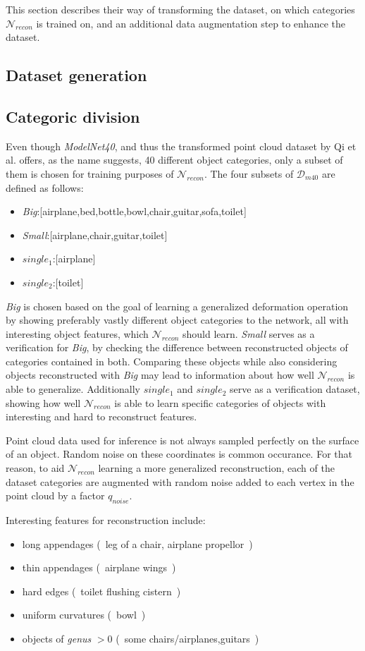    This section describes their way of transforming the dataset, on which categories
   $\mathcal{N}_{recon}$ is trained on, and an additional data augmentation step to
   enhance the dataset.

\subsection{Dataset generation}
\subsection{Categoric division}
Even though \emph{ModelNet40}, and thus the transformed point cloud dataset by Qi et al. offers, as the name suggests,
40 different object categories, only a subset of them is chosen for training purposes of $\mathcal{N}_{recon}$. 
The four subsets of $\mathcal{D}_{m40}$ are defined as follows:
\begin{itemize}
   \item \emph{Big}:[airplane,bed,bottle,bowl,chair,guitar,sofa,toilet]
   \item \emph{Small}:[airplane,chair,guitar,toilet]
   \item \emph{$single_1$}:[airplane]
   \item \emph{$single_2$}:[toilet]
\end{itemize}
\emph{Big} is chosen based on the goal of learning a generalized deformation operation by showing preferably vastly different object categories
to the network, all with interesting object features, which $\mathcal{N}_{recon}$ should learn.
\emph{Small} serves as a verification for \emph{Big}, by checking the difference between reconstructed objects of categories contained in both.
Comparing these objects while also considering objects reconstructed with \emph{Big} may lead to information about how well $\mathcal{N}_{recon}$ is
able to generalize. 
Additionally $single_1$ and $single_2$ serve as a verification dataset, showing how well $\mathcal{N}_{recon}$ is able to learn specific categories of 
objects with interesting and hard to reconstruct features.

Point cloud data used for inference is not always sampled perfectly on the surface of an object. Random noise on these coordinates is common occurance.
For that reason, to aid $\mathcal{N}_{recon}$ learning a more generalized reconstruction, each of the dataset categories are
 augmented with random noise added to each vertex in the point cloud by a factor $q_{noise}$.

 Interesting features for reconstruction include:
 \begin{itemize}
   \item long appendages (~leg of a chair, airplane propellor~)
   \item thin appendages (~airplane wings~)
   \item hard edges (~toilet flushing cistern~)
   \item uniform curvatures (~bowl~)
   \item objects of \emph{genus} $>0$ (~some chairs/airplanes,guitars~)
 \end{itemize}
